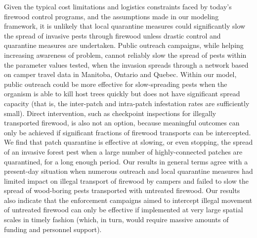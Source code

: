 Given the typical cost limitations and logistics constraints faced by today’s firewood control programs, and the assumptions made in our modeling framework, it is unlikely that local quarantine measures could significantly slow the spread of invasive pests through firewood unless drastic control and quarantine measures are undertaken. Public outreach campaigns, while helping increasing awareness of problem, cannot reliably slow the spread of pests within the parameter values tested, when the invasion spreads through a network based on camper travel data in Manitoba, Ontario and Quebec. Within our model, public outreach could be more effective for slow-spreading pests when the organism is able to kill host trees quickly but does not have significant spread capacity (that is, the inter-patch and intra-patch infestation rates are sufficiently small). Direct intervention, such as checkpoint inspections for illegally transported firewood, is also not an option, because meaningful outcomes can only be achieved if significant fractions of firewood transports can be intercepted. We find that patch quarantine is effective at slowing, or even stopping, the spread of an invasive forest pest when a large number of highly-connected patches are quarantined, for a long enough period. Our results in general terms agree with a present-day situation when numerous outreach and local quarantine measures had limited impact on illegal transport of firewood by campers and failed to slow the spread of wood-boring pests transported with untreated firewood. Our results also indicate that the enforcement campaigns aimed to intercept illegal movement of untreated firewood can only be effective if implemented at very large spatial scales in timely fashion (which, in turn, would require massive amounts of funding and personnel support).

